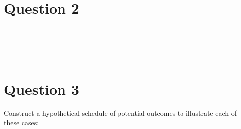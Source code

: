 \documentclass[11pt,notitlepage]{article}\usepackage[]{graphicx}\usepackage[]{color}
\makeatletter
\newenvironment{kframe}{%
 \def\at@end@of@kframe{}%
 \ifinner\ifhmode%
  \def\at@end@of@kframe{\end{minipage}}%
  \begin{minipage}{\columnwidth}%
 \fi\fi%
 \def\FrameCommand##1{\hskip\@totalleftmargin \hskip-\fboxsep
 \colorbox{shadecolor}{##1}\hskip-\fboxsep
     \hskip-\linewidth \hskip-\@totalleftmargin \hskip\columnwidth}%
 \MakeFramed {\advance\hsize-\width
   \@totalleftmargin\z@ \linewidth\hsize
   \@setminipage}}%
 {\par\unskip\endMakeFramed%
 \at@end@of@kframe}
\newenvironment{knitrout}{}{} %
\makeatother
\begin{document}
\section*{Question 2}
\begin{knitrout}
\color{fgcolor}\begin{kframe}
\begin{verbatim}





\end{verbatim}
\end{kframe}
\end{knitrout}


\section*{Question 3}
Construct a hypothetical schedule of potential outcomes to illustrate each of these cases:
\end{document}
